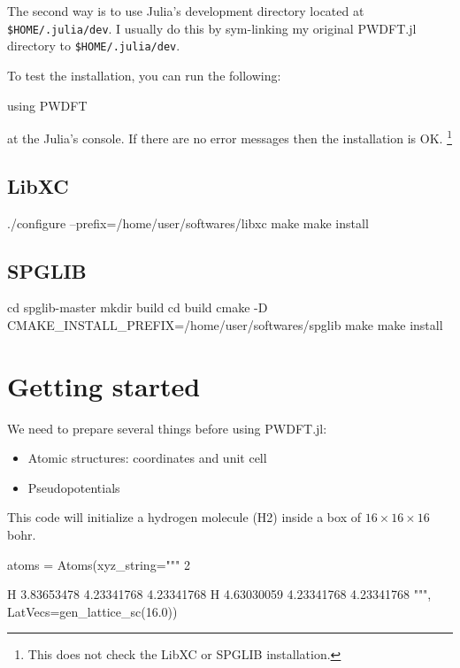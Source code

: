 \documentclass[a4paper,10pt]{paper}
\begin{document}
The second way is to use Julia's development directory located at
\texttt{\$HOME/.julia/dev}.
I usually do this by sym-linking my original \textsf{PWDFT.jl} directory
to \texttt{\$HOME/.julia/dev}.

To test the installation, you can run the following:
\begin{juliacode}
using PWDFT
\end{juliacode}
at the Julia's console.
If there are no error messages then the installation is OK.
\footnote{This does not check the LibXC or SPGLIB installation.}

\subsection{LibXC}

\begin{textcode}
./configure --prefix=/home/user/softwares/libxc
make
make install
\end{textcode}

\subsection{SPGLIB}

\begin{textcode}
cd spglib-master
mkdir build
cd build
cmake -D CMAKE_INSTALL_PREFIX=/home/user/softwares/spglib
make
make install
\end{textcode}


\section{Getting started}

We need to prepare several things before using \textsf{PWDFT.jl}:
\begin{itemize}
\item Atomic structures: coordinates and unit cell
\item Pseudopotentials
\end{itemize}

This code will initialize a hydrogen molecule (H2) inside a box of
$16\times16\times16$ bohr.
\begin{juliacode}
atoms = Atoms(xyz_string="""
              2
              
              H      3.83653478       4.23341768       4.23341768
              H      4.63030059       4.23341768       4.23341768
              """,
              LatVecs=gen_lattice_sc(16.0))
\end{juliacode}
\end{document}
